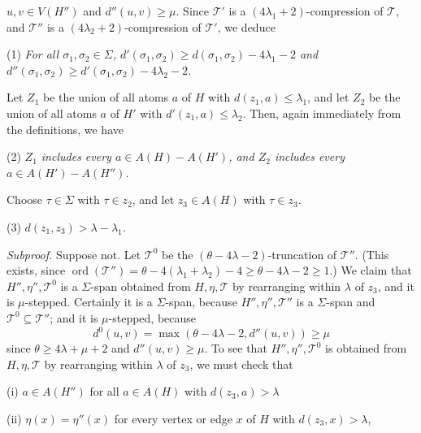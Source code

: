 \noindent $u, v \in V(H'')$ and $d''(u, v) \ge \mu$. Since $\mathscr{T}'$ is a $(4\lambda_1 + 2)$-compression of $\mathscr{T}$, and $\mathscr{T}''$ is a $(4\lambda_2 + 2)$-compression of $\mathscr{T}'$, we deduce

\hspace*{12pt}(1) \textit{For all $\sigma_1, \sigma_2 \in \Sigma$, $d'(\sigma_1, \sigma_2) \ge d(\sigma_1, \sigma_2) - 4\lambda_1 - 2$ and $d''(\sigma_1, \sigma_2) \ge d'(\sigma_1, \sigma_2) - 4\lambda_2 - 2$.}

Let $Z_1$ be the union of all atoms $a$ of $H$ with $d(z_1, a) \le \lambda_1$, and let $Z_2$ be the union of all atoms $a$ of $H'$ with $d'(z_1, a) \le \lambda_2$. Then, again immediately from the definitions, we have

\hspace*{12pt}(2) \textit{$Z_1$ includes every $a \in A(H) - A(H')$, and $Z_2$ includes every $a \in A(H') - A(H'')$.}

Choose $\tau \in \Sigma$ with $\tau \in z_2$, and let $z_3 \in A(H)$ with $\tau \in z_3$.

\hspace*{12pt}(3) \textit{$d(z_1, z_3) > \lambda - \lambda_1$.}

\textit{Subproof.} Suppose not. Let $\mathscr{T}^0$ be the $(\theta - 4\lambda - 2)$-truncation of $\mathscr{T}''$. (This exists, since $\operatorname{ord}(\mathscr{T}'') = \theta - 4(\lambda_1 + \lambda_2) - 4 \ge \theta - 4\lambda - 2 \ge 1$.) We claim that $H'', \eta'', \mathscr{T}^0$ is a $\Sigma$-span obtained from $H, \eta, \mathscr{T}$ by rearranging within $\lambda$ of $z_3$, and it is $\mu$-stepped. Certainly it is a $\Sigma$-span, because $H'', \eta'', \mathscr{T}''$ is a $\Sigma$-span and $\mathscr{T}^0 \subseteq \mathscr{T}''$; and it is $\mu$-stepped, because
\begin{equation*}
d^0(u, v) = \max(\theta - 4\lambda - 2, d''(u, v)) \ge \mu
\end{equation*}
since $\theta \ge 4\lambda + \mu + 2$ and $d''(u, v) \ge \mu$. To see that $H'', \eta'', \mathscr{T}^0$ is obtained from $H, \eta, \mathscr{T}$ by rearranging within $\lambda$ of $z_3$, we must check that

\hspace*{12pt}(i) $a \in A(H'')$ for all $a \in A(H)$ with $d(z_3, a) > \lambda$

\hspace*{12pt}(ii) $\eta(x) = \eta''(x)$ for every vertex or edge $x$ of $H$ with $d(z_3, x) > \lambda$,

